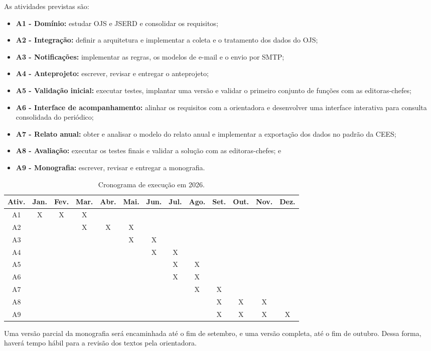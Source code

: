 As atividades previstas são:

\begin{itemize}
    \item \textbf{A1 - Domínio:} estudar OJS e JSERD e consolidar os requisitos;
    \item \textbf{A2 - Integração:} definir a arquitetura e implementar a coleta e o tratamento dos dados do OJS;
    \item \textbf{A3 - Notificações:} implementar as regras, os modelos de e-mail e o envio por SMTP;
    \item \textbf{A4 - Anteprojeto:} escrever, revisar e entregar o anteprojeto;
    \item \textbf{A5 - Validação inicial:} executar testes, implantar uma versão e validar o primeiro conjunto de funções com as editoras-chefes;
    \item \textbf{A6 - Interface de acompanhamento:} alinhar os requisitos com a orientadora e desenvolver uma interface interativa para consulta consolidada do periódico;
    \item \textbf{A7 - Relato anual:} obter e analisar o modelo do relato anual e implementar a exportação dos dados no padrão da CEES;
    \item \textbf{A8 - Avaliação:} executar os testes finais e validar a solução com as editoras-chefes; e
    \item \textbf{A9 - Monografia:} escrever, revisar e entregar a monografia.
\end{itemize}

\begin{table}[htb]
\caption{Cronograma de execução em 2026.}
\label{tbl-intro-cronograma}
\centering
\scriptsize
\setlength{\tabcolsep}{3.2pt}
\begin{tabular}{|c|c|c|c|c|c|c|c|c|c|c|c|c|}\hline
\textbf{Ativ.} & \textbf{Jan.} & \textbf{Fev.} & \textbf{Mar.} & \textbf{Abr.} & \textbf{Mai.} & \textbf{Jun.} & \textbf{Jul.} & \textbf{Ago.} & \textbf{Set.} & \textbf{Out.} & \textbf{Nov.} & \textbf{Dez.} \\\hline
A1 & X & X & X &   &   &   &   &   &   &   &   &   \\\hline
A2 &   &   & X & X & X &   &   &   &   &   &   &   \\\hline
A3 &   &   &   &   & X & X &   &   &   &   &   &   \\\hline
A4 &   &   &   &   &   & X & X &   &   &   &   &   \\\hline
A5 &   &   &   &   &   &   & X & X &   &   &   &   \\\hline
A6 &   &   &   &   &   &   & X & X &   &   &   &   \\\hline
A7 &   &   &   &   &   &   &   & X & X &   &   &   \\\hline
A8 &   &   &   &   &   &   &   &   & X & X & X &   \\\hline
A9 &   &   &   &   &   &   &   &   & X & X & X & X \\\hline
\end{tabular}
\end{table}

Uma versão parcial da monografia será encaminhada até o fim de setembro, e uma versão completa, até o fim de outubro. Dessa forma, haverá tempo hábil para a revisão dos textos pela orientadora.
